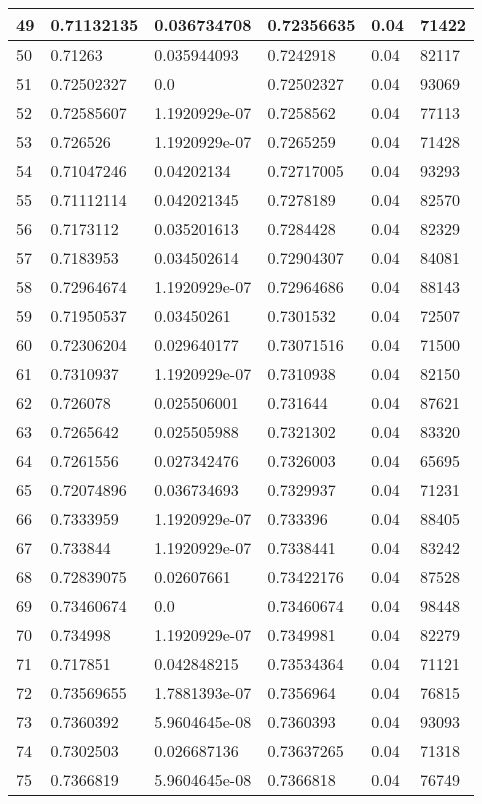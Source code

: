 \begin{longtable}{|l|l|l|l|l|l|}
49 & 0.71132135 & 0.036734708 & 0.72356635 & 0.04 & 71422 \\ \hline 
50 & 0.71263 & 0.035944093 & 0.7242918 & 0.04 & 82117 \\ \hline 
51 & 0.72502327 & 0.0 & 0.72502327 & 0.04 & 93069 \\ \hline 
52 & 0.72585607 & 1.1920929e-07 & 0.7258562 & 0.04 & 77113 \\ \hline 
53 & 0.726526 & 1.1920929e-07 & 0.7265259 & 0.04 & 71428 \\ \hline 
54 & 0.71047246 & 0.04202134 & 0.72717005 & 0.04 & 93293 \\ \hline 
55 & 0.71112114 & 0.042021345 & 0.7278189 & 0.04 & 82570 \\ \hline 
56 & 0.7173112 & 0.035201613 & 0.7284428 & 0.04 & 82329 \\ \hline 
57 & 0.7183953 & 0.034502614 & 0.72904307 & 0.04 & 84081 \\ \hline 
58 & 0.72964674 & 1.1920929e-07 & 0.72964686 & 0.04 & 88143 \\ \hline 
59 & 0.71950537 & 0.03450261 & 0.7301532 & 0.04 & 72507 \\ \hline 
60 & 0.72306204 & 0.029640177 & 0.73071516 & 0.04 & 71500 \\ \hline 
61 & 0.7310937 & 1.1920929e-07 & 0.7310938 & 0.04 & 82150 \\ \hline 
62 & 0.726078 & 0.025506001 & 0.731644 & 0.04 & 87621 \\ \hline 
63 & 0.7265642 & 0.025505988 & 0.7321302 & 0.04 & 83320 \\ \hline 
64 & 0.7261556 & 0.027342476 & 0.7326003 & 0.04 & 65695 \\ \hline 
65 & 0.72074896 & 0.036734693 & 0.7329937 & 0.04 & 71231 \\ \hline 
66 & 0.7333959 & 1.1920929e-07 & 0.733396 & 0.04 & 88405 \\ \hline 
67 & 0.733844 & 1.1920929e-07 & 0.7338441 & 0.04 & 83242 \\ \hline 
68 & 0.72839075 & 0.02607661 & 0.73422176 & 0.04 & 87528 \\ \hline 
69 & 0.73460674 & 0.0 & 0.73460674 & 0.04 & 98448 \\ \hline 
70 & 0.734998 & 1.1920929e-07 & 0.7349981 & 0.04 & 82279 \\ \hline 
71 & 0.717851 & 0.042848215 & 0.73534364 & 0.04 & 71121 \\ \hline 
72 & 0.73569655 & 1.7881393e-07 & 0.7356964 & 0.04 & 76815 \\ \hline 
73 & 0.7360392 & 5.9604645e-08 & 0.7360393 & 0.04 & 93093 \\ \hline 
74 & 0.7302503 & 0.026687136 & 0.73637265 & 0.04 & 71318 \\ \hline 
75 & 0.7366819 & 5.9604645e-08 & 0.7366818 & 0.04 & 76749 \\ \hline 
\end{longtable}